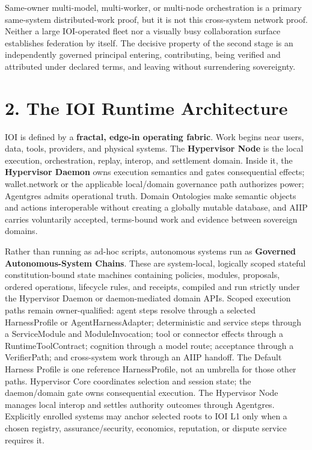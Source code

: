 \documentclass[
  11pt,
]{article}
\begin{document}
Same-owner multi-model, multi-worker, or multi-node orchestration is a primary
same-system distributed-work proof, but it is not this cross-system network
proof. Neither a large IOI-operated
fleet nor a visually busy collaboration surface establishes federation by
itself. The decisive property of the second stage is an independently governed principal entering,
contributing, being verified and attributed under declared terms, and leaving
without surrendering sovereignty.

\hypertarget{the-ioi-runtime-architecture}{%
\section{2. The IOI Runtime
Architecture}\label{the-ioi-runtime-architecture}}

IOI is defined by a \textbf{fractal, edge-in operating fabric}. Work
begins near users, data, tools, providers, and physical systems. The
\textbf{Hypervisor Node} is the local execution, orchestration, replay,
interop, and settlement domain. Inside it, the \textbf{Hypervisor
Daemon} owns execution semantics and gates consequential effects;
wallet.network or the applicable local/domain governance path authorizes
power; Agentgres admits operational truth. Domain Ontologies
make semantic objects and actions interoperable without creating a
globally mutable database, and AIIP carries voluntarily accepted, terms-bound
work and evidence between sovereign domains.

Rather than running as ad-hoc scripts, autonomous systems run as
\textbf{Governed Autonomous-System Chains}. These are system-local, logically
scoped stateful
constitution-bound state machines containing policies, modules, proposals,
ordered operations, lifecycle rules, and receipts, compiled and run strictly under the Hypervisor Daemon or
daemon-mediated domain APIs. Scoped execution paths remain owner-qualified:
agent steps resolve through a selected HarnessProfile or
AgentHarnessAdapter; deterministic and service steps through a ServiceModule
and ModuleInvocation; tool or connector effects through a
RuntimeToolContract; cognition through a model route; acceptance through a
VerifierPath; and cross-system work through an AIIP handoff. The Default
Harness Profile is one reference HarnessProfile, not an umbrella for those
other paths. Hypervisor Core coordinates selection and session state; the
daemon/domain gate owns consequential execution. The
Hypervisor Node manages local interop and settles authority outcomes
through Agentgres. Explicitly enrolled systems may anchor selected roots to IOI
L1 only when a chosen registry, assurance/security, economics, reputation, or
dispute service requires it.
\end{document}
